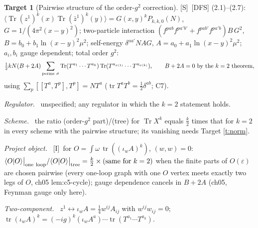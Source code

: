 \documentclass[11pt]{article}
\theoremstyle{definition}
\newtheorem{target}{Target}
\newcommand{\Tr}{\operatorname{Tr}}
\newcommand{\tr}{\operatorname{tr}}
\newcommand{\Sl}{\textup{[S]}}
\newcommand{\Il}{\textup{[I]}}
\newcommand{\tree}{\big|_{\rm tree}}
\newcommand{\oneloop}{\big|_{\rm one\ loop}}
\newcommand{\fld}[1]{\par\textit{#1.}\ }
\begin{document}
\begin{target}[Pairwise structure of the order-$g^2$ correction]\label{t:dfs}
\Sl\ [DFS] (2.1)--(2.7): $\langle\Tr(z^1)^k(x)\Tr(\bar z^1)^k(y)\rangle=G(x,y)^kP_{k,k,0}(N)$, $G=1/(4\pi^2(x-y)^2)$; two-particle interaction $(f^{pab}f^{pa'b'}+f^{pab'}f^{pa'b})B\,G^2$, $B=b_0+b_1\ln(x-y)^2\mu^2$; self-energy $\delta^{aa'}NAG$, $A=a_0+a_1\ln(x-y)^2\mu^2$; $a_i,b_i$ gauge dependent; total order $g^2$:
\[
\tfrac12kN(B+2A)\sum_{\rm perms\ \sigma}\Tr(T^{a_1}\cdots T^{a_k})\Tr(T^{a_{\sigma(1)}}\cdots T^{a_{\sigma(k)}}),\qquad B+2A=0\ \text{by the }k=2\text{ theorem},
\]
using $\sum_p[[T^a,T^p],T^p]=NT^a$ ($\tr T^aT^b=\tfrac12\delta^{ab}$; C7).
\fld{Regulator} unspecified; any regulator in which the $k=2$ statement holds.
\fld{Scheme} the ratio (order-$g^2$ part)/(tree) for $\Tr X^k$ equals $\tfrac k2$ times that for $k=2$ in every scheme with the pairwise structure; its vanishing needs Target \ref{t:norm}.
\fld{Project object} \Il\ for $O=\int\omega\,\tr((\iota_wA)^k)$, $(w,w)=0$: $\langle O|O\rangle\oneloop/\langle O|O\rangle\tree=\tfrac k2\times(\text{same for }k=2)$ when the finite parts of $O(\varepsilon)$ are chosen pairwise (every one-loop graph with one $O$ vertex meets exactly two legs of $O$, ch05 lem:c5-cycle); gauge dependence cancels in $B+2A$ (ch05, Feynman gauge only here).
\fld{Two-component} $z^1\leftrightarrow\iota_wA=\tfrac14w^{ij}A_{ij}$ with $w^{ij}w_{ij}=0$; $\tr(\iota_wA)^k=(-ig)^k(\iota_wA^a)\cdots\tr(T^{a_1}\cdots T^{a_k})$.
\end{target}
\end{document}
